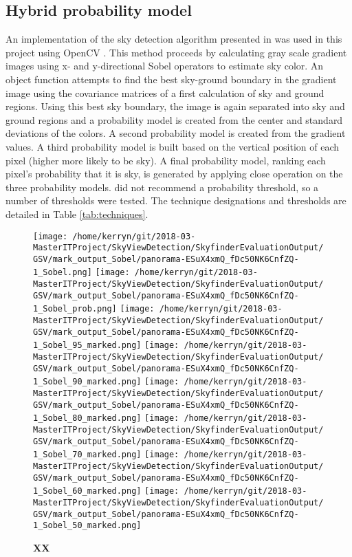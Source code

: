 \documentclass[final,3p,times,authoryear]{elsarticle}
\begin{document}
\subsection{Hybrid probability model}\label{sec:prob}
An implementation of the sky detection algorithm presented in \cite{Wang2015a} was used in this project using OpenCV \citep{Bradski2000}. This method proceeds by calculating gray scale gradient images using x- and y-directional Sobel operators to estimate sky color. An object function attempts to find the best sky-ground boundary in the gradient image using the covariance matrices of a first calculation of sky and ground regions. Using this best sky boundary, the image is again separated into sky and ground regions and a probability model is created from the center and standard deviations of the colors. A second probability model is created from the gradient values. A third probability model is built based on the vertical position of each pixel (higher more likely to be sky). A final probability model, ranking each pixel's probability that it is sky, is generated by applying close operation on the three probability models. \cite{Wang2015a} did not recommend a probability threshold, so a number of thresholds were tested. The technique designations and thresholds are detailed in Table \ref{tab:techniques}.



\begin{figure}
\centering    
\texttt{[image: /home/kerryn/git/2018-03-MasterITProject/SkyViewDetection/SkyfinderEvaluationOutput/GSV/mark\_output\_Sobel/panorama-ESuX4xmQ\_fDc50NK6CnfZQ-1\_Sobel.png]}  
\texttt{[image: /home/kerryn/git/2018-03-MasterITProject/SkyViewDetection/SkyfinderEvaluationOutput/GSV/mark\_output\_Sobel/panorama-ESuX4xmQ\_fDc50NK6CnfZQ-1\_Sobel\_prob.png]} 
\texttt{[image: /home/kerryn/git/2018-03-MasterITProject/SkyViewDetection/SkyfinderEvaluationOutput/GSV/mark\_output\_Sobel/panorama-ESuX4xmQ\_fDc50NK6CnfZQ-1\_Sobel\_95\_marked.png]} 
\texttt{[image: /home/kerryn/git/2018-03-MasterITProject/SkyViewDetection/SkyfinderEvaluationOutput/GSV/mark\_output\_Sobel/panorama-ESuX4xmQ\_fDc50NK6CnfZQ-1\_Sobel\_90\_marked.png]} 
\texttt{[image: /home/kerryn/git/2018-03-MasterITProject/SkyViewDetection/SkyfinderEvaluationOutput/GSV/mark\_output\_Sobel/panorama-ESuX4xmQ\_fDc50NK6CnfZQ-1\_Sobel\_80\_marked.png]} 
\texttt{[image: /home/kerryn/git/2018-03-MasterITProject/SkyViewDetection/SkyfinderEvaluationOutput/GSV/mark\_output\_Sobel/panorama-ESuX4xmQ\_fDc50NK6CnfZQ-1\_Sobel\_70\_marked.png]} 
\texttt{[image: /home/kerryn/git/2018-03-MasterITProject/SkyViewDetection/SkyfinderEvaluationOutput/GSV/mark\_output\_Sobel/panorama-ESuX4xmQ\_fDc50NK6CnfZQ-1\_Sobel\_60\_marked.png]} 
\texttt{[image: /home/kerryn/git/2018-03-MasterITProject/SkyViewDetection/SkyfinderEvaluationOutput/GSV/mark\_output\_Sobel/panorama-ESuX4xmQ\_fDc50NK6CnfZQ-1\_Sobel\_50\_marked.png]} 
\caption{\bf  XX }    
 \label{fig:mel23000}  
\end{figure} 
\end{document}
